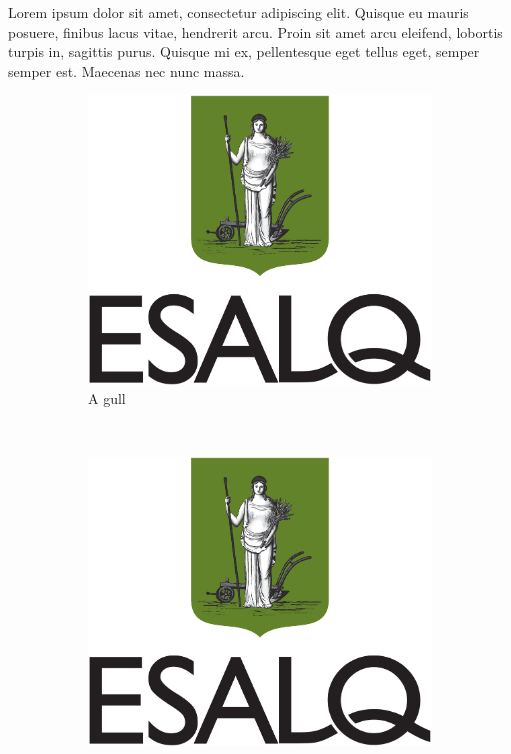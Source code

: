 \documentclass{article}
\begin{document}
\begin{figure}[!ht]
\begin{minipage}{0.2\textwidth}
		\end{minipage}
		
	\end{figure}
	
	Lorem ipsum dolor sit amet, consectetur adipiscing elit. Quisque eu mauris posuere, finibus lacus vitae, hendrerit arcu. Proin sit amet arcu eleifend, lobortis turpis in, sagittis purus. Quisque mi ex, pellentesque eget tellus eget, semper semper est. Maecenas nec nunc massa. 
	
	\begin{figure}
		\centering
		\begin{subfigure}[b]{0.3\textwidth}
			\includegraphics[width=\textwidth]{Figuras/brasao_esalq1.jpg}
			\caption{A gull}
			\label{fig:gull}
		\end{subfigure}
		~ %
		\begin{subfigure}[b]{0.3\textwidth}
			\includegraphics[width=\textwidth]{Figuras/brasao_esalq1.jpg}

\end{subfigure}
\end{figure}
\end{document}
